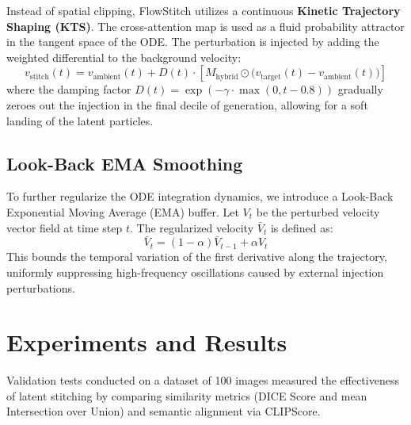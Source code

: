 \documentclass[12pt,a4paper]{report}
\begin{document}
Instead of spatial clipping, FlowStitch utilizes a continuous \textbf{Kinetic Trajectory Shaping (KTS)}. The cross-attention map is used as a fluid probability attractor in the tangent space of the ODE. The perturbation is injected by adding the weighted differential to the background velocity:
\begin{equation}
    v_{\text{stitch}}(t) = v_{\text{ambient}}(t) + D(t) \cdot \left[ M_{\text{hybrid}} \odot \Big( v_{\text{target}}(t) - v_{\text{ambient}}(t) \Big) \right]
\end{equation}
where the damping factor $D(t) = \exp(-\gamma \cdot \max(0, t - 0.8))$ gradually zeroes out the injection in the final decile of generation, allowing for a soft landing of the latent particles.

\section{Look-Back EMA Smoothing}
To further regularize the ODE integration dynamics, we introduce a Look-Back Exponential Moving Average (EMA) buffer. Let $V_t$ be the perturbed velocity vector field at time step $t$. The regularized velocity $\bar{V}_t$ is defined as:
\begin{equation}
    \bar{V}_t = (1 - \alpha)\bar{V}_{t-1} + \alpha V_t
\end{equation}
This bounds the temporal variation of the first derivative along the trajectory, uniformly suppressing high-frequency oscillations caused by external injection perturbations.

\chapter{Experiments and Results}

Validation tests conducted on a dataset of 100 images measured the effectiveness of latent stitching by comparing similarity metrics (DICE Score and mean Intersection over Union) and semantic alignment via CLIPScore.
\end{document}
